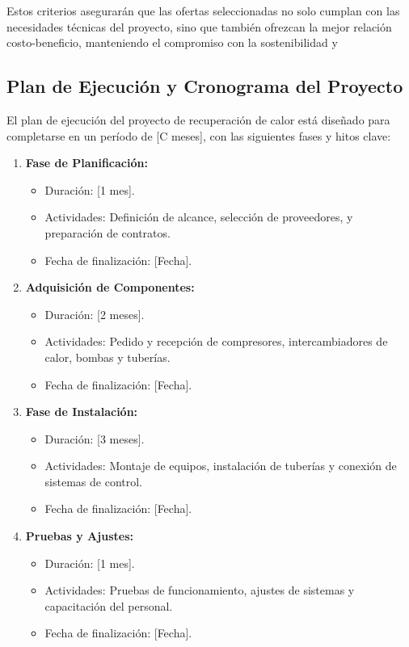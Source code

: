 \documentclass[11pt,a4paper]{article}  %
\begin{document}
Estos criterios asegurarán que las ofertas seleccionadas no solo cumplan con las necesidades técnicas del proyecto, sino que también ofrezcan la mejor relación costo-beneficio, manteniendo el compromiso con la sostenibilidad y


\subsection{Plan de Ejecución y Cronograma del Proyecto}
El plan de ejecución del proyecto de recuperación de calor está diseñado para completarse en un período de [C meses], con las siguientes fases y hitos clave:

\begin{enumerate}
    \item \textbf{Fase de Planificación:}
    \begin{itemize}
        \item Duración: [1 mes].
        \item Actividades: Definición de alcance, selección de proveedores, y preparación de contratos.
        \item Fecha de finalización: [Fecha].
    \end{itemize}

    \item \textbf{Adquisición de Componentes:}
    \begin{itemize}
        \item Duración: [2 meses].
        \item Actividades: Pedido y recepción de compresores, intercambiadores de calor, bombas y tuberías.
        \item Fecha de finalización: [Fecha].
    \end{itemize}

    \item \textbf{Fase de Instalación:}
    \begin{itemize}
        \item Duración: [3 meses].
        \item Actividades: Montaje de equipos, instalación de tuberías y conexión de sistemas de control.
        \item Fecha de finalización: [Fecha].
    \end{itemize}

    \item \textbf{Pruebas y Ajustes:}
    \begin{itemize}
        \item Duración: [1 mes].
        \item Actividades: Pruebas de funcionamiento, ajustes de sistemas y capacitación del personal.
        \item Fecha de finalización: [Fecha].
    \end{itemize}


\end{enumerate}
\end{document}
